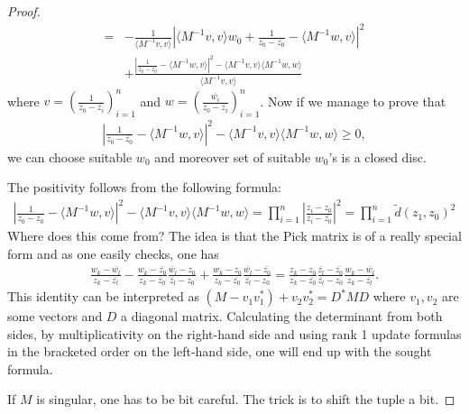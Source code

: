 \begin{proof}
\begin{align*}
		=&  -\frac{1}{\langle M^{-1} v, v \rangle} \left|\langle M^{-1} v, v \rangle w_{0} +  \frac{1}{z_{0} - \overline{z_{0}}} - \langle M^{-1} w, v \rangle\right|^{2} \\
		&+ \frac{\left|\frac{1}{z_{0} - \overline{z_{0}}} - \langle M^{-1} w, v \rangle\right|^{2} - \langle M^{-1} v, v \rangle\langle M^{-1} w, w \rangle}{\langle M^{-1} v, v \rangle}
	\end{align*}
	where $v = (\frac{1}{z_{0} - \overline{z_{i}}})_{i = 1}^{n}$ and $w = (\frac{\overline{w_{i}}}{z_{0} - \overline{z_{i}}})_{i = 1}^{n}$. Now if we manage to prove that
	\begin{align*}
	\left|\frac{1}{z_{0} - \overline{z_{0}}} - \langle M^{-1} w, v \rangle\right|^{2} - \langle M^{-1} v, v \rangle\langle M^{-1} w, w \rangle \geq 0,
	\end{align*}
	we can choose suitable $w_{0}$ and moreover set of suitable $w_{0}$'s is a closed disc.

	The positivity follows from the following formula:
	\begin{align*}
		\left|\frac{1}{z_{0} - \overline{z_{0}}} - \langle M^{-1} w, v \rangle\right|^{2} - \langle M^{-1} v, v \rangle\langle M^{-1} w, w \rangle = \prod_{i = 1}^{n} \left|\frac{z_{i} - z_{0}}{z_{i} - \overline{z_{0}}}\right|^{2} = \prod_{i = 1}^{n} \tilde{d}(z_{1}, z_{0})^{2}
	\end{align*}
	Where does this come from? The idea is that the Pick matrix is of a really special form and as one easily checks, one has
	\begin{align*}
		\frac{w_{k} - \overline{w_{l}}}{z_{k} - \overline{z_{l}}} -\frac{w_{k} - \overline{z_{0}}}{z_{k} - \overline{z_{0}}}\frac{\overline{w_{l}} - z_{0}}{\overline{z_{l}} - z_{0}} +  \frac{w_{k} - z_{0}}{z_{k} - \overline{z_{0}}}\frac{\overline{w_{l}} - \overline{z_{0}}}{\overline{z_{l}} - z_{0}} = \frac{z_{k} - z_{0}}{z_{k} - \overline{z_{0}}}\frac{\overline{z_{l}} - \overline{z_{0}}}{\overline{z_{l}} - z_{0}}\frac{w_{k} - \overline{w_{l}}}{z_{k} - \overline{z_{l}}}.
	\end{align*}
	This identity can be interpreted as $(M - v_{1} v_{1}^{*}) + v_{2} v_{2}^{*} = D^{*} M D$ where $v_{1}, v_{2}$ are some vectors and $D$ a diagonal matrix. Calculating the determinant from both sides, by multiplicativity on the right-hand side and using rank 1 update formulas in the bracketed order on the left-hand side, one will end up with the sought formula.

	If $M$ is singular, one has to be bit careful. The trick is to shift the tuple a bit.


\end{proof}
